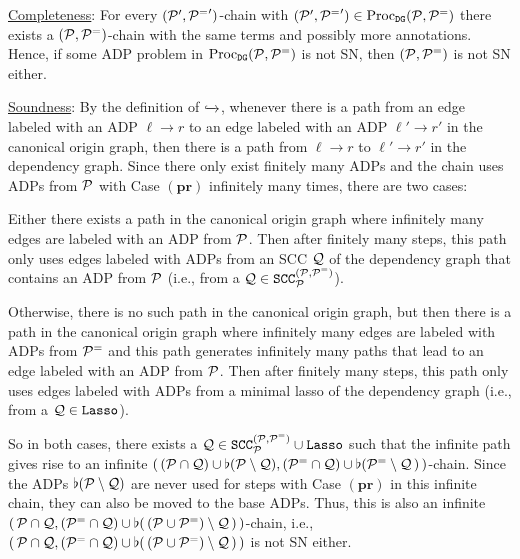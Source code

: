 \begin{myproof}
    \underline{Completeness}:
    For every $(\mathcal{P}', {\mathcal{P}^{=}}')$-chain with $(\mathcal{P}', {\mathcal{P}^{=}}') \in
    \operatorname{Proc}_{\mathtt{DG}}(\mathcal{P},\mathcal{P}^{=})$ there exists a $(\mathcal{P}, \mathcal{P}^{=})$-chain with
    the same terms and possibly more annotations.
    Hence, if some ADP problem in $\operatorname{Proc}_{\mathtt{DG}}(\mathcal{P},\mathcal{P}^{=})$ is not SN, then
    $(\mathcal{P}, \mathcal{P}^{=})$ is
    not SN either.

    \smallskip

    \noindent
    \underline{Soundness}:
    By the definition of $\mathrel{ \xhookrightarrow{{}_{\scriptstyle }} \!\!{}^{}_{} }$, whenever there is a path from an edge labeled with
    an ADP $\ell \to r$ to an edge labeled with an ADP 
    $\ell' \to r'$ in the canonical origin graph, then there is a path from 
    $\ell \to r$ to
    $\ell' \to r'$ in the dependency graph. Since there only exist finitely many ADPs and the
    chain uses ADPs from $\mathcal{P}$ with Case $(\mathbf{pr})$ infinitely many times, there are
    two cases:

    Either there exists a path in the canonical origin graph where infinitely many edges are labeled
    with an ADP from $\mathcal{P}$. Then after finitely many steps, this path only uses edges
    labeled with ADPs from an SCC $\mathcal{Q}$ of the dependency graph that contains an ADP from $\mathcal{P}$
    (i.e., from a $\mathcal{Q}
    \in \mathtt{SCC}_{\mathcal{P}}^{(\mathcal{P}, \mathcal{P}^{=})}$).

    Otherwise, there is no such path in the canonical origin graph, but then there is a path in the
    canonical origin graph where infinitely many edges are labeled with ADPs from $\mathcal{P}^=$ and this path
    generates infinitely many paths that lead to an edge labeled with an ADP from $\mathcal{P}$. 
    Then after finitely many steps,
    this path only uses edges
    labeled with ADPs from a minimal lasso of the dependency graph (i.e., from a
    $\mathcal{Q} \in \mathtt{Lasso}$).

    So in both cases, there exists a $\mathcal{Q} \in \mathtt{SCC}_{\mathcal{P}}^{(\mathcal{P}, \mathcal{P}^{=})} \cup \mathtt{Lasso}$
    such that the infinite path gives rise to an infinite $(\,(\mathcal{P} \cap \mathcal{Q}) \cup \flat(\mathcal{P} \setminus \mathcal{Q}), (\mathcal{P}^= \cap \mathcal{Q}) \cup \flat(\mathcal{P}^{=} \setminus \mathcal{Q} \,)\,)$-chain.
    Since the ADPs $\flat(\mathcal{P} \setminus \mathcal{Q})$ are never used for steps with 
    Case $(\mathbf{pr})$ in this infinite chain, they can also be moved to the base ADPs. Thus, this is also an
    infinite $(\,\mathcal{P} \cap \mathcal{Q}, (\mathcal{P}^= \cap \mathcal{Q})\cup \flat( \,(\mathcal{P} \cup \mathcal{P}^{=}) \setminus \mathcal{Q} \,)\,)$-chain, 
    i.e., $(\,\mathcal{P} \cap \mathcal{Q}, (\mathcal{P}^= \cap \mathcal{Q})\cup \flat( \,(\mathcal{P} \cup \mathcal{P}^{=}) \setminus \mathcal{Q} \,)\,)$ is not SN either.
\end{myproof}

